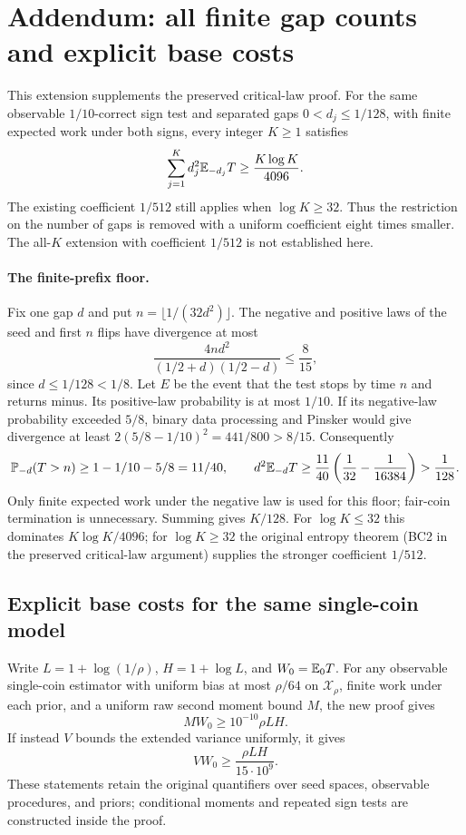 \section*{Addendum: all finite gap counts and explicit base costs}
{}

This extension supplements the preserved critical-law proof. For the same
observable $1/10$-correct sign test and separated gaps $0<d_j\le1/128$,
with finite expected work under both signs, every integer $K\ge1$ satisfies
\[
 \sum_{j=1}^K d_j^2\mathbb E_{-d_j}T\ge\frac{K\log K}{4096}.
\]
The existing coefficient $1/512$ still applies when $\log K\ge32$.
Thus the restriction on the number of gaps is removed with a uniform
coefficient eight times smaller. The all-$K$ extension with coefficient
$1/512$ is not established here.

\paragraph{The finite-prefix floor.}
Fix one gap $d$ and put $n=\lfloor1/(32d^2)\rfloor$. The negative and
positive laws of the seed and first $n$ flips have divergence at most
\[
 \frac{4nd^2}{(1/2+d)(1/2-d)}\le\frac8{15},
\]
since $d\le1/128<1/8$. Let $E$ be the event that the test stops by time
$n$ and returns minus. Its positive-law probability is at most $1/10$.
If its negative-law probability exceeded $5/8$, binary data processing
and Pinsker would give divergence at least
$2(5/8-1/10)^2=441/800>8/15$. Consequently
\[
 \mathbb P_{-d}(T>n)\ge1-1/10-5/8=11/40,
 \qquad
 d^2\mathbb E_{-d}T\ge\frac{11}{40}\left(\frac1{32}-\frac1{16384}\right)
 >\frac1{128}.
\]
Only finite expected work under the negative law is used for this floor;
fair-coin termination is unnecessary. Summing gives $K/128$. For
$\log K\le32$ this dominates $K\log K/4096$; for $\log K\ge32$ the
original entropy theorem (BC2 in the preserved critical-law argument)
supplies the stronger coefficient $1/512$.

\subsection*{Explicit base costs for the same single-coin model}
{}
Write $L=1+\log(1/\rho)$, $H=1+\log L$, and $W_0=\mathbb E_0T$.
For any observable single-coin estimator with uniform bias at most
$\rho/64$ on $\mathcal X_\rho$, finite work under each prior, and a
uniform raw second moment bound $M$, the new proof gives
\[
 M W_0\ge 10^{-10}\rho LH.
\]
If instead $V$ bounds the extended variance uniformly, it gives
\[
 V W_0\ge\frac{\rho LH}{15\cdot10^9}.
\]
These statements retain the original quantifiers over seed spaces,
observable procedures, and priors; conditional moments and repeated
sign tests are constructed inside the proof.

